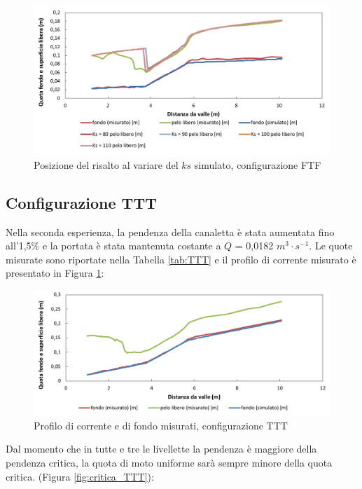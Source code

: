 \documentclass[12pt]{article} %
\begin{document}
\begin{figure}[H]
    \centering
    \includegraphics[width=\textwidth]{FTFrisalto5.5.png}
    \caption{Posizione del risalto al variare del $ks$ simulato, configurazione FTF}
\end{figure}

\newpage

\subsection{Configurazione TTT}

\noindent Nella seconda esperienza, la pendenza della canaletta è stata aumentata fino all’1,5\% e la portata è stata mantenuta costante a $Q$ = 0,0182 $m^3\cdot s^{-1}$. 
Le quote misurate sono riportate nella Tabella \ref{tab:TTT} e il profilo di corrente misurato è presentato in Figura \ref{fig:profilo_TTT}:

\begin{figure}[H]
    \centering
    \includegraphics[width=\textwidth]{TTTbase.png}
    \caption{Profilo di corrente e di fondo misurati, configurazione TTT}
    \label{fig:profilo_TTT}
\end{figure}

\noindent Dal momento che in tutte e tre le livellette la pendenza è maggiore della pendenza critica, la quota di moto uniforme sarà sempre minore della quota critica. (Figura \ref{fig:critica_TTT}): 
\end{document}
